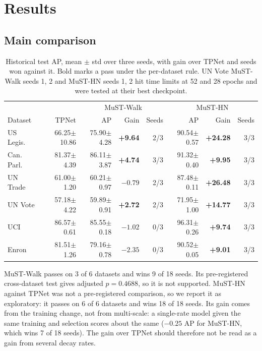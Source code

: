 \documentclass[11pt,a4paper]{article}
\theoremstyle{plain}
\theoremstyle{definition}
\begin{document}
\section{Results}\label{sec:results}
\subsection{Main comparison}
\begin{table}[H]\centering\small\setlength{\tabcolsep}{4pt}
\begin{tabular}{lrrrrrrr}
\toprule
 & & \multicolumn{3}{c}{MuST-Walk} & \multicolumn{3}{c}{MuST-HN}\\
Dataset & TPNet & AP & Gain & Seeds & AP & Gain & Seeds\\
\midrule
US Legis. & 66.25$\pm$10.86 & 75.90$\pm$4.28 & \textbf{+9.64} & 2/3 & 90.54$\pm$0.57 & \textbf{+24.28} & 3/3\\
Can. Parl. & 81.37$\pm$4.39 & 86.11$\pm$3.87 & \textbf{+4.74} & 3/3 & 91.32$\pm$0.40 & \textbf{+9.95} & 3/3\\
UN Trade & 61.00$\pm$1.20 & 60.21$\pm$0.97 & $-0.79$ & 2/3 & 87.48$\pm$0.11 & \textbf{+26.48} & 3/3\\
UN Vote & 57.18$\pm$4.22 & 59.89$\pm$0.91 & \textbf{+2.72} & 2/3 & 71.95$\pm$1.00 & \textbf{+14.77} & 3/3\\
UCI & 86.57$\pm$0.61 & 85.55$\pm$0.18 & $-1.02$ & 0/3 & 96.31$\pm$0.26 & \textbf{+9.74} & 3/3\\
Enron & 81.51$\pm$1.26 & 79.16$\pm$0.78 & $-2.35$ & 0/3 & 90.52$\pm$0.05 & \textbf{+9.01} & 3/3\\
\bottomrule
\end{tabular}
\caption{Historical test AP, mean $\pm$ std over three seeds, with gain over TPNet and seeds won against it. Bold marks a pass under the per-dataset rule. UN Vote MuST-Walk seeds 1, 2 and MuST-HN seeds 1, 2 hit time limits at 52 and 28 epochs and were tested at their best checkpoint.}\label{tab:main}
\end{table}

MuST-Walk passes on 3 of 6 datasets and wins 9 of 18 seeds. Its pre-registered cross-dataset test gives adjusted $p=0.4688$, so it is not supported. MuST-HN against TPNet was not a pre-registered comparison, so we report it as exploratory: it passes on 6 of 6 datasets and wins 18 of 18 seeds. Its gain comes from the training change, not from multi-scale: a single-rate model given the same training and selection scores about the same ($-0.25$ AP for MuST-HN, which wins 7 of 18 seeds). The gain over TPNet should therefore not be read as a gain from several decay rates.
\end{document}
